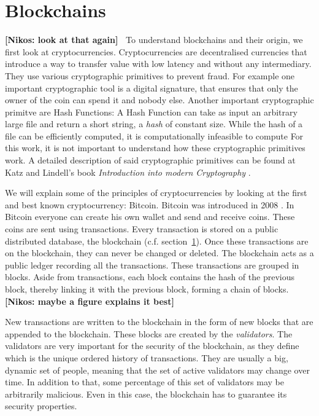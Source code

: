 \documentclass{cacthesis}
\newcommand{\authnote}[3]{{ \footnotesize \textbf{#1[#2: #3]~}}}
\newcommand{\niknote}[1]{\authnote{\color{red}}{Nikos}{#1}}
\begin{document}
\section{Blockchains}
\label{sec:blockchain}
\niknote{look at that again}
To understand blockchains and their origin, we first look at cryptocurrencies.
Cryptocurrencies are decentralised currencies that introduce a way to transfer value with low latency and without any intermediary. They use various cryptographic primitives to prevent fraud. For example one important cryptographic tool is a digital signature, that ensures that only the owner of the coin can spend it and nobody else. Another important cryptographic primitve are Hash Functions: A Hash Function can take as input an arbitrary large file and return a short string, a \emph{hash} of constant size. While the hash of a file can be efficiently computed, it is computationally infeasible to compute    For this work, it is not important to understand how these cryptographic primitives work. A detailed description of said cryptographic primitives can be found at Katz and Lindell's book \emph{Introduction into modern Cryptography} \cite{Katz2020-aj}. 

We will explain some of the principles of cryptocurrencies by looking at the first and best known cryptocurrency: Bitcoin. Bitcoin was introduced in 2008 \cite{nakamoto_bitcoin_nodate}. In Bitcoin everyone can create his own wallet and send and receive coins. These coins are sent using transactions. Every transaction is stored on a public distributed database, the blockchain (c.f. section~\ref{sec:blockchain}). Once these transactions are on the blockchain, they can never be changed or deleted. The blockchain acts as a public ledger recording all the transactions.
These transactions are grouped in blocks. Aside from transactions, each block contains the hash of the previous block, thereby linking it with the previous block, forming a chain of blocks. \niknote{maybe a figure explains it best}   \newline

New transactions are written to the blockchain in the form of new blocks that are appended to the blockchain.  These blocks are created by the \emph{validators}.
The validators are very important for the security of the blockchain, as they define which is the unique ordered history of transactions. They are usually a big, dynamic set of people, meaning that the set of active validators may change over time. In addition to that, some percentage of this set of validators may be arbitrarily malicious. Even in this case, the blockchain has to guarantee its security properties.\newline
\end{document}
